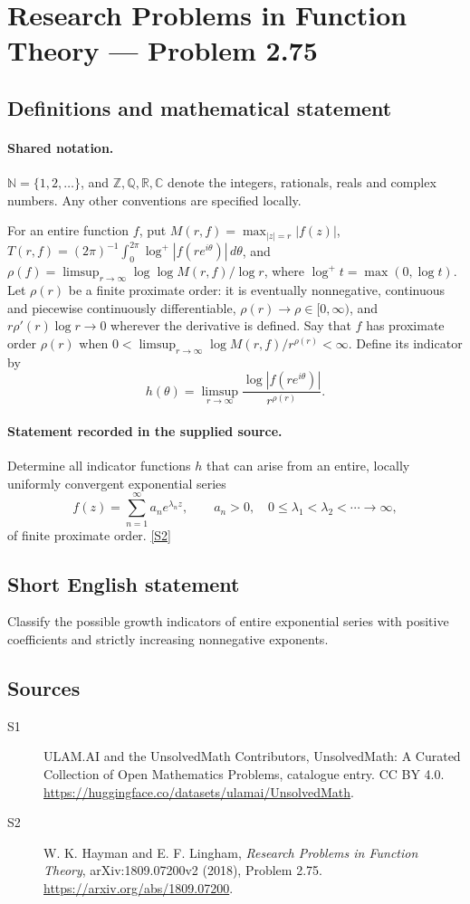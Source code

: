 \documentclass[11pt]{article}
\newcommand{\sref}[2]{\hyperlink{source:#1:#2}{[S#2]}}
\begin{document}
\section{Research Problems in Function Theory — Problem 2.75}\label{statement}

\subsection{Definitions and mathematical statement}

\paragraph{Shared notation.}$\mathbb N=\{1,2,\ldots\}$, and $\mathbb Z,\mathbb Q,\mathbb R,\mathbb C$ denote the integers, rationals, reals and complex numbers. Any other conventions are specified locally.


For an entire function $f$, put $M(r,f)=\max_{|z|=r}|f(z)|$, $T(r,f)=(2\pi)^{-1}\int_0^{2\pi}\log^+|f(re^{i\theta})|\,d\theta$, and $\rho(f)=\limsup_{r\to\infty}\log\log M(r,f)/\log r$, where $\log^+t=\max(0,\log t)$. Let $\rho(r)$ be a finite proximate order: it is eventually nonnegative, continuous and piecewise continuously differentiable, $\rho(r)\to\rho\in[0,\infty)$, and $r\rho'(r)\log r\to0$ wherever the derivative is defined. Say that $f$ has proximate order $\rho(r)$ when $0<\limsup_{r\to\infty}\log M(r,f)/r^{\rho(r)}<\infty$. Define its indicator by
\[h(\theta)=\limsup_{r\to\infty}\frac{\log|f(re^{i\theta})|}{r^{\rho(r)}}.\]
\paragraph{Statement recorded in the supplied source.}
Determine all indicator functions $h$ that can arise from an entire, locally uniformly convergent exponential series
\[f(z)=\sum_{n=1}^{\infty}a_n e^{\lambda_n z},\qquad a_n>0,\quad0\leq\lambda_1<\lambda_2<\cdots\to\infty,\]
of finite proximate order. \sref{statement}{2}
\subsection{Short English statement}
Classify the possible growth indicators of entire exponential series with positive coefficients and strictly increasing nonnegative exponents.
\subsection{Sources}
\begin{description}
\item[\hypertarget{source:statement:1}{S1}] ULAM.AI and the UnsolvedMath Contributors, UnsolvedMath: A Curated Collection of Open Mathematics Problems, catalogue entry. CC BY 4.0. \url{https://huggingface.co/datasets/ulamai/UnsolvedMath}.
\item[\hypertarget{source:statement:2}{S2}] W. K. Hayman and E. F. Lingham, \emph{Research Problems in Function Theory}, arXiv:1809.07200v2 (2018), Problem 2.75. \url{https://arxiv.org/abs/1809.07200}.
\end{description}
\label{end:statement}
\end{document}
